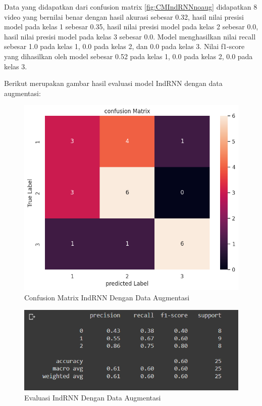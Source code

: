 Data yang didapatkan dari confusion matrix \ref{fig:CMIndRNNnoaug} didapatkan 8 video yang bernilai benar
dengan hasil akurasi sebesar 0.32, hasil nilai presisi model pada kelas 1 sebesar 0.35, hasil nilai
presisi model pada kelas 2 sebesar 0.0, hasil nilai presisi model pada kelas 3 sebesar 0.0. Model menghasilkan
nilai recall sebesar 1.0 pada kelas 1, 0.0 pada kelas 2, dan 0.0 pada kelas 3. Nilai f1-score yang dihasilkan
oleh model sebesar 0.52 pada kelas 1, 0.0 pada kelas 2, 0.0 pada kelas 3.

Berikut merupakan gambar hasil evaluasi model IndRNN  dengan data augmentasi:
\newpage
\begin{figure} [H] \centering
  \includegraphics[scale=0.5]{gambar/CMIndRNNaug.png}
  \caption{Confusion Matrix IndRNN Dengan Data Augmentasi}
  \label{fig:CMIndRNNaug}
\end{figure}

\begin{figure} [H] \centering
  \includegraphics[scale=0.85]{gambar/scoreIndRNNaug.png}
  \caption{Evaluasi IndRNN Dengan Data Augmentasi}
  \label{fig:ScoreIndRNNaug}
\end{figure}

